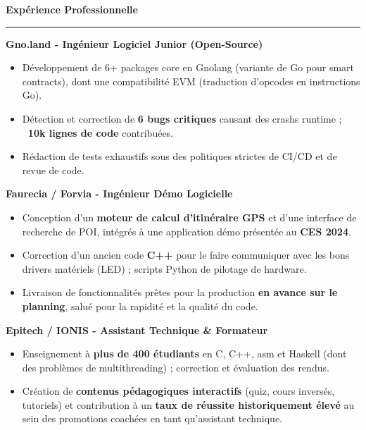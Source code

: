 \documentclass[9pt]{extarticle}
\begin{document}
\par\vspace{5pt}

{\large\bfseries Expérience Professionnelle}
\par\vspace{-8pt}
\rule{\linewidth}{0.4pt}
\par\vspace{5pt}

{\bfseries Gno.land - Ingénieur Logiciel Junior (Open-Source)}
\begin{itemize}[noitemsep, topsep=0pt]
	\item Développement de 6+ packages core en Gnolang (variante de Go pour smart contracts), dont une compatibilité EVM (traduction d'opcodes en instructions Go).
	\item Détection et correction de {\bfseries 6 bugs critiques} causant des crashs runtime ; {\bfseries ~10k lignes de code} contribuées.
	\item Rédaction de tests exhaustifs sous des politiques strictes de CI/CD et de revue de code.
\end{itemize}

\par\vspace{5pt}

{\bfseries Faurecia / Forvia - Ingénieur Démo Logicielle}
\begin{itemize}[noitemsep, topsep=0pt]
	\item Conception d'un {\bfseries moteur de calcul d'itinéraire GPS} et d'une interface de recherche de POI, intégrés à une application démo présentée au {\bfseries CES 2024}.
	\item Correction d'un ancien code {\bfseries C++} pour le faire communiquer avec les bons drivers matériels (LED) ; scripts Python de pilotage de hardware.
	\item Livraison de fonctionnalités prêtes pour la production {\bfseries en avance sur le planning}, salué pour la rapidité et la qualité du code.
\end{itemize}

\par\vspace{5pt}

{\bfseries Epitech / IONIS - Assistant Technique \& Formateur}
\begin{itemize}[noitemsep, topsep=0pt]
	\item Enseignement à {\bfseries plus de 400 étudiants} en C, C++, asm et Haskell (dont des problèmes de multithreading) ; correction et évaluation des rendus.
	\item Création de {\bfseries contenus pédagogiques interactifs} (quiz, cours inversés, tutoriels) et contribution à un {\bfseries taux de réussite historiquement élevé} au sein des promotions coachées en tant qu'assistant technique.
\end{itemize}
\end{document}
